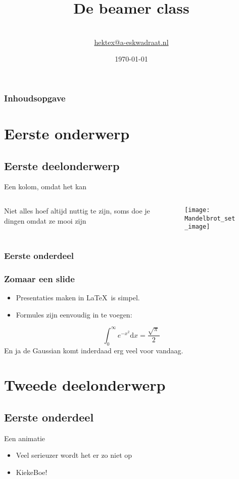 \documentclass[usepdftitle,invisible]{beamer}
\begin{document}
\author{\aeskwadraat \TeXniCie\\
 \url{hektex@a-eskwadraat.nl}}
\title{De beamer class}
\date{\today}
\begin{frame}
\titlepage
\end{frame}
\begin{frame}
 \frametitle{Inhoudsopgave}
 \tableofcontents
\end{frame}
\section{Eerste onderwerp}
\subsection{Eerste deelonderwerp}
\begin{frame}{Een kolom, omdat het kan}
     \begin{columns}[T]
     \begin{column}[T]{5cm}
     Niet alles hoef altijd nuttig te zijn, soms doe je dingen omdat ze mooi zijn \\
     \end{column}
     \begin{column}[T]{5cm}
     \begin{figure}
          \texttt{[image: Mandelbrot\_set\_image]}
     \end{figure}

     \end{column}
     \end{columns}
\end{frame}
\subsubsection{Eerste onderdeel}
\begin{frame}
\frametitle{Zomaar een slide}
\begin{itemize}
\item Presentaties maken in \LaTeX\ is simpel.
\item Formules zijn eenvoudig in te voegen:
\end{itemize}
$$\int^\infty_0 e^{-x^2} \text{d}x = \frac{\sqrt{\pi}}{2}$$
En ja de Gaussian komt inderdaad erg veel voor vandaag.
\end{frame}

\section{Tweede deelonderwerp}
\subsection{Eerste onderdeel}
\begin{frame}{Een animatie}
  \begin{itemize}[<+->]
     \item Veel serieuzer wordt het er zo niet op
     \item KiekeBoe!
  \end{itemize}
\end{frame}
\end{document}
